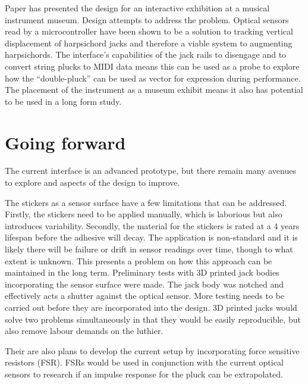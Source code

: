 Paper has presented the design for an interactive exhibition at a musical instrument museum. Design attempts to address the problem.
Optical sensors read by a microcontroller have been shown to be a solution to tracking vertical displacement of harpsichord jacks and therefore a viable system to augmenting harpsichords. The interface's capabilities of the jack rails to disengage and to convert string plucks to MIDI data means this can be used as a probe to explore how the ``double-pluck'' can be used as vector for expression during performance. The placement of the instrument as a museum exhibit means it also has potential to be used in a long form study.

\section{Going forward}\label{going-forward}

The current interface is an advanced prototype, but there remain many avenues to explore and aspects of the design to improve.

The stickers as a sensor surface have a few limitations that can be addressed. Firstly, the stickers need to be applied manually, which is laborious but also introduces variability. Secondly, the material for the stickers is rated at a 4 years lifespan before the adhesive will decay. The application is non-standard and it is likely there will be failure or drift in sensor readings over time, though to what extent is unknown. This presents a problem on how this approach can be maintained in the long term. Preliminary tests with 3D printed jack bodies incorporating the sensor surface were made. The jack body was notched and effectively acts a shutter against the optical sensor. More testing needs to be carried out before they are incorporated into the design. 3D printed jacks would solve two problems simultaneously in that they would be easily reproducible, but also remove labour demands on the luthier.

Their are also plans to develop the current setup by incorporating force sensitive resistors (FSR). 
FSRs would be used in conjunction with the current optical sensors to research if an impulse response for the pluck can be extrapolated.


